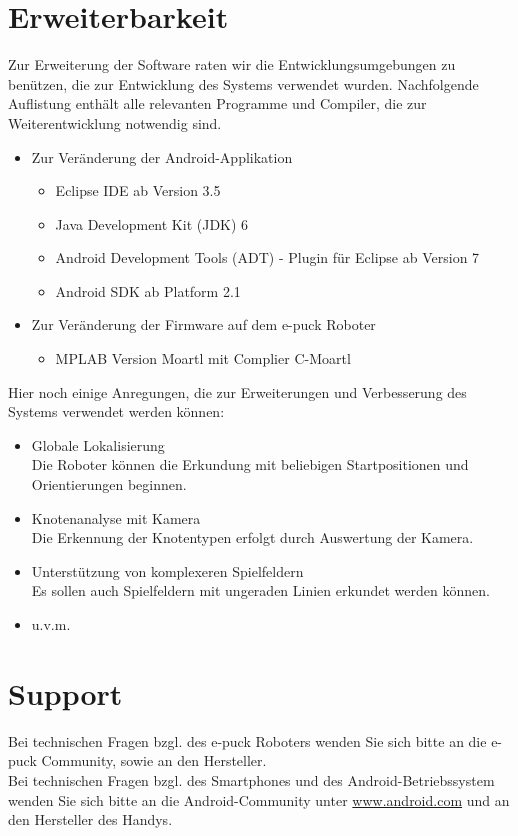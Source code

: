 \documentclass[10pt,a4paper]{article}
\let\oldsection\section
\renewcommand{\section}{\newpage \oldsection}
\begin{document}
\section{Erweiterbarkeit}
	Zur Erweiterung der Software raten wir die Entwicklungsumgebungen zu ben\"utzen, die zur Entwicklung des Systems verwendet wurden.
	Nachfolgende Auflistung enth\"alt alle relevanten Programme und Compiler, die zur Weiterentwicklung notwendig sind.
	\begin{itemize}
		\item{Zur Ver\"anderung der Android-Applikation}
		\begin{itemize}
			\item{Eclipse IDE ab Version 3.5}
			\item{Java Development Kit (JDK) 6}
			\item{Android Development Tools (ADT) - Plugin f\"ur Eclipse ab Version 7}
			\item{Android SDK ab Platform 2.1}
		\end{itemize}
		\item{Zur Ver\"anderung der Firmware auf dem e-puck Roboter}
		\begin{itemize}
			\item{MPLAB Version Moartl mit Complier C-Moartl}
		\end{itemize}
	\end{itemize}
	Hier noch einige Anregungen, die zur Erweiterungen und Verbesserung des Systems verwendet werden k\"onnen:
	\begin{itemize}
		\item{Globale Lokalisierung} \\ Die Roboter k\"onnen die Erkundung mit beliebigen Startpositionen und Orientierungen beginnen.
		\item{Knotenanalyse mit Kamera} \\ Die Erkennung der Knotentypen erfolgt durch Auswertung der Kamera.
		\item{Unterst\"utzung von komplexeren Spielfeldern} \\ Es sollen auch Spielfeldern mit ungeraden Linien erkundet werden k\"onnen.
		\item{u.v.m.}
	\end{itemize}
	
\section{Support}
	Bei technischen Fragen bzgl. des e-puck Roboters wenden Sie sich bitte an die e-puck Community, sowie an den Hersteller. \\
	Bei technischen Fragen bzgl. des Smartphones und des Android-Betriebssystem wenden Sie sich bitte an die Android-Community unter \url{www.android.com} 
	und an den Hersteller des Handys.
\end{document}
